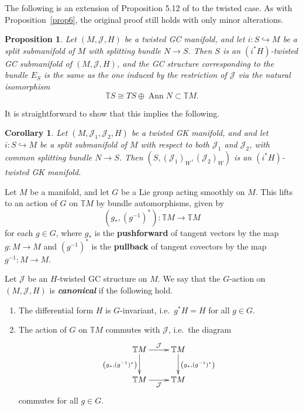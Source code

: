 \documentclass[11pt]{article}
\newtheorem{Proposition}[Theorem]{Proposition}
\newtheorem{Corollary}[Theorem]{Corollary}
{\theoremstyle{definition}
\newtheorem{Remark}[Theorem]{Remark}
\newtheorem{Definition}[Theorem]{Definition}
\newtheorem{Example}[Theorem]{Example}
}
\numberwithin{equation}{section}
\newcommand{\deff}[1]{\textbf{\emph{#1}}}
\newcommand{\func}[3]{#1 \colon #2 \to #3}
\newcommand{\hookfunc}[3]{#1 \colon #2 \hookrightarrow #3}
\newcommand{\pont}[1]{\mathbb{T} {#1}}
\newcommand{\tang}{T}
\begin{document}
The following is an extension of Proposition 5.12 of \cite{benbassat} to the twisted case.  As with Proposition~\ref{prop6}, the original proof still holds with only minor alterations.


\begin{Proposition}
Let $(M,\mathcal{J},H)$ be a twisted GC manifold, and
let $\hookfunc{i}{S}{M}$ be a split submanifold of $M$ with splitting bundle $N \to S$.  Then $S$ is an $(i^* H)$-twisted GC submanifold of $(M,\mathcal{J},H)$, and the GC structure corresponding to the bundle $E_S$ is the same as the one induced by the restriction of $\mathcal{J}$ via the natural isomorphism
\[
  \pont{S} \cong \tang S \oplus \operatorname{Ann} N \subset \pont{M}.
\]
\end{Proposition}

It is straightforward to show that this implies the following.

\begin{Corollary}
Let $(M, \mathcal{J}_1, \mathcal{J}_2,H)$ be a twisted GK manifold, and and
let $\hookfunc{i}{S}{M}$ be a split submanifold of $M$ with respect to both $\mathcal{J}_1$ and $\mathcal{J}_2$, with common splitting bundle $N \to S$.  Then $\left( S, (\mathcal{J}_1)_W, (\mathcal{J}_2)_W \right)$ is an $(i^*H)$-twisted GK manifold.
\end{Corollary}


\begin{Definition}
Let $M$ be a manifold, and let $G$ be a Lie group acting smoothly on $M$.  This lifts to an action of $G$ on $\pont{M}$ by bundle automorphisms, given by
\[
  \func{\left( g_*, (g^{-1})^* \right)}{\pont{M}}{\pont{M}}
\]
for each $g \in G$, where $g_{\ast}$ is the {\bf pushforward} of tangent vectors by the map $\func{g}{M}{M}$ and $(g^{-1})^{\ast}$ is the {\bf pullback} of tangent covectors by the map $\func{g^{-1}}{M}{M}$.

Let $\mathcal{J}$ be an $H$-twisted GC structure on $M$.  We say that the $G$-action on $(M, \mathcal{J}, H)$ is \deff{canonical} if the following hold.
\begin{enumerate}\itemsep=0pt
  \item The dif\/ferential form $H$ is $G$-invariant, i.e.\ $g^* H = H$ for all $g \in G$.
  \item The action of $G$ on $\pont{M}$ commutes with $\mathcal{J}$, i.e.\ the diagram
\[
  \xymatrix{
  \pont{M} \ar[d]_{ \left( g_*, (g^{-1})^* \right) } \ar[r]^{\mathcal{J}}
  &
  \pont{M} \ar[d]^{ \left( g_*, (g^{-1})^* \right) } \\
  \pont{M} \ar[r]_{\mathcal{J}}
  &
  \pont{M}
  }
\]
commutes for all $g \in G$.
\end{enumerate}
\end{Definition}
\end{document}
